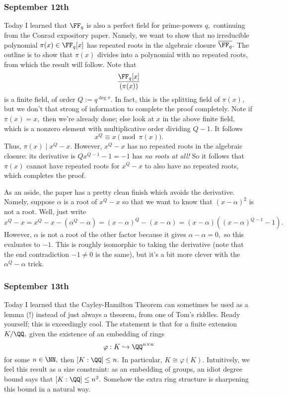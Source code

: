 \subsubsection{September 12th}
Today I learned that $\FF_q$ is also a perfect field for prime-powers $q,$ continuing from the Conrad expository paper. Namely, we want to show that no irreducible polynomial $\pi(x)\in\FF_q[x]$ has repeated roots in the algebraic closure $\overline{\FF_q}.$ The outline is to show that $\pi(x)$ divides into a polynomial with no repeated roots, from which the result will follow. Note that
\[\frac{\FF_q[x]}{(\pi(x))}\]
is a finite field, of order $Q:=q^{\deg\pi}.$ In fact, this is the splitting field of $\pi(x),$ but we don't that strong of information to complete the proof completely. Note if $\pi(x)=x,$ then we're already done; else look at $x$ in the above finite field, which is a nonzero element with multiplicative order dividing $Q-1.$ It follows
\[x^Q\equiv x\pmod{\pi(x)}.\]
Thus, $\pi(x)\mid x^Q-x.$ However, $x^Q-x$ has no repeated roots in the algebraic closure: its derivative is $Qx^{Q-1}-1=-1$ has \textit{no roots at all!} So it follows that $\pi(x)$ cannot have repeated roots for $x^Q-x$ to also have no repeated roots, which completes the proof.

As an aside, the paper has a pretty clean finish which avoids the derivative. Namely, suppose $\alpha$ is a root of $x^Q-x$ so that we want to know that $(x-\alpha)^2$ is not a root. Well, just write
\[x^Q-x=x^Q-x-\left(\alpha^Q-\alpha\right)=(x-\alpha)^Q-(x-\alpha)=(x-\alpha)\left((x-\alpha)^{Q-1}-1\right).\]
However, $\alpha$ is not a root of the other factor because it gives $\alpha-\alpha=0,$ so this evaluates to $-1.$ This is roughly isomorphic to taking the derivative (note that the end contradiction $-1\ne0$ is the same), but it's a bit more clever with the $\alpha^Q-\alpha$ trick.

\subsubsection{September 13th}
Today I learned that the Cayley-Hamilton Theorem can sometimes be used as a lemma (!) instead of just always a theorem, from one of Tom's riddles. Ready yourself; this is exceedingly cool. The statement is that for a finite extension $K/\QQ,$ given the existence of an embedding of rings
\[\varphi:K\hookrightarrow\QQ^{n\times n}\]
for some $n\in\NN,$ then $[K:\QQ]\le n.$ In particular, $K\cong\varphi(K).$ Intuitively, we feel this result as a size constraint: as an embedding of groups, an idiot degree bound says that $[K:\QQ]\le n^2.$ Somehow the extra ring structure is sharpening this bound in a natural way.

